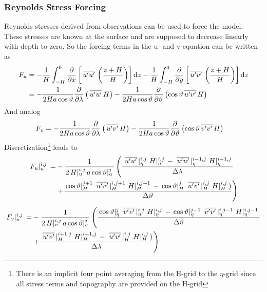 \documentclass[a4paper]{article}
\begin{document}
\subsubsection{Reynolds Stress Forcing}
Reynolds stresses derived from observations can be used to force the
model. These stresses are known at the surface and are supposed to decrease
linearly with depth to zero. So the forcing terms in the u- and v-equation can
be written as
\begin{equation}
  \begin{split}
    F_u&=-\frac1H\int_{-H}^0\frac{\partial {}}{\partial {x}}\left[\,\overline{{u}'{u}'}\,\left(\frac{z+H}H\right)\right]{\rm d}
    z -
    \frac1H\int_{-H}^0\frac{\partial {}}{\partial {y}}\left[\,\overline{{u}'{v}'}\,\left(\frac{z+H}H\right)\right]{\rm d}
    z\\
    &=-\frac1{2Ha\cos\vartheta}\frac{\partial {}}{\partial {\lambda}}\left(\,\overline{{u}'{u}'}\,H\right)-\frac1{2Ha\cos\vartheta}\frac{\partial {}}{\partial {\vartheta}}\left(\cos\vartheta\,\overline{{u}'{v}'}\,H\right)
  \end{split}
\end{equation}
And analog
\begin{equation}
  \begin{split}
    F_v&=-\frac1{2Ha\cos\vartheta}\frac{\partial {}}{\partial {\lambda}}\left(\,\overline{{u}'{v}'}\,H\right)-\frac1{2Ha\cos\vartheta}\frac{\partial {}}{\partial {\vartheta}}\left(\cos\vartheta\,\overline{{v}'{v}'}\,H\right)
  \end{split}
\end{equation}
Discretization\footnote{There is an implicit four point
  averaging from the H-grid to the $\eta$-grid since all stress terms and topography are
  provided on the H-grid} leads to
\begin{equation}
  \begin{split}
    \,{F_u}\vert_{u}^{{i},{j}}\,=&-\frac1{2\,{H}\vert_{u}^{{i},{j}}\,a\,{\cos\vartheta}\vert_{u}^{{j}}\,}\left(\frac{\,{\,\overline{{u}'{u}'}\,}\vert_{\eta}^{{i},{j}}\,\,{H}\vert_{\eta}^{{i},{j}}\,-\,{\,\overline{{u}'{u}'}\,}\vert_{\eta}^{{i-1},{j}}\,\,{H}\vert_{\eta}^{{i-1},{j}}\,}{\Delta\lambda}\right.\\
&\left.+\frac{\,{\cos\vartheta}\vert_{H}^{{j+1}}\,\,{\,\overline{{u}'{v}'}\,}\vert_{H}^{{i},{j+1}}\,\,{H}\vert_{H}^{{i},{j+1}}\,-\,{\cos\vartheta}\vert_{H}^{{j}}\,\,{\,\overline{{u}'{v}'}\,}\vert_{H}^{{i},{j}}\,\,{H}\vert_{H}^{{i},{j}}\,)}{
\Delta\vartheta }\right)
  \end{split}
\end{equation}
\begin{equation}
  \begin{split}
    \,{F_v}\vert_{v}^{{i},{j}}\,=&-\frac1{2\,{H}\vert_{v}^{{i},{j}}\,a\,{\cos\vartheta}\vert_{v}^{{j}}\,}\left(\frac{\,{\cos\vartheta}\vert_{\eta}^{{j}}\,\,{\,\overline{{v}'{v}'}\,}\vert_{\eta}^{{i},{j}}\,\,{H}\vert_{\eta}^{{i},{j}}\,-\,{\cos\vartheta}\vert_{\eta}^{{j-1}}\,\,{\,\overline{{v}'{v}'}\,}\vert_{\eta}^{{i},{j-1}}\,\,{H}\vert_{\eta}^{{i},{j-1}}\,}{\Delta\vartheta}\right.\\
&\left.+\frac{\,{\,\overline{{u}'{v}'}\,}\vert_{H}^{{i+1},{j}}\,\,{H}\vert_{H}^{{i+1},{j}}\,-\,{\,\overline{{u}'{v}'}\,}\vert_{H}^{{i},{j}}\,\,{H}\vert_{H}^{{i},{j}}\,)}{\Delta\lambda}\right)
  \end{split}
\end{equation}
\end{document}
